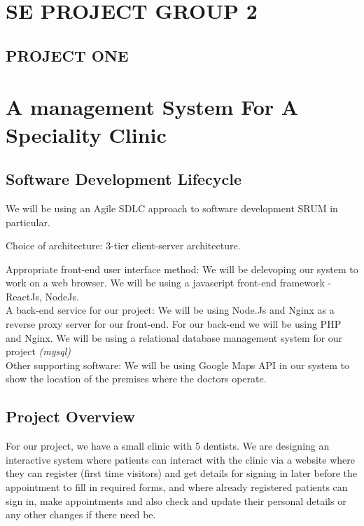 \documentclass{article}
\begin{document}
\section*{SE PROJECT GROUP 2}
\subsection*{PROJECT ONE}
\section*{A management System For A Speciality Clinic}
\subsection*{Software Development Lifecycle}

We will be using an Agile SDLC approach to software development SRUM in particular.

Choice of architecture: 3-tier client-server architecture.

Appropriate front-end user interface method: We will be delevoping our system to work on a web browser. We will be using a javascript front-end framework - ReactJs, NodeJs.\\

A back-end service for our project:
We will be using Node.Js and Nginx as a reverse proxy server for our front-end. 
For our back-end we will be using PHP and Nginx.
We will be using a relational database management system for our project \textit{(mysql)}\\

Other supporting software: We will be using Google Maps API in our system to show the location of the premises where the doctors operate.

\subsection*{Project Overview}

For our project, we have a small clinic with 5 dentists. We are designing an
interactive system where patients can interact with the clinic via a website where
they can register (first time visitors) and get details for signing in later before
the appointment to fill in required forms, and where already registered patients
can sign in, make appointments and also check and update their personal details
or any other changes if there need be.
\end{document}
